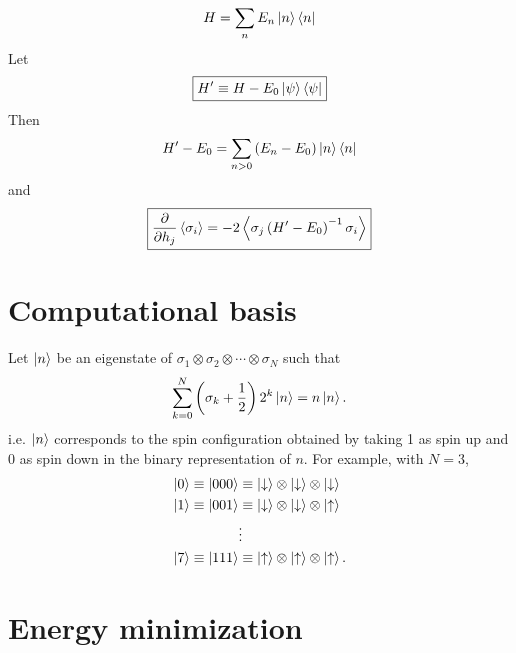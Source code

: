 \begin{equation}
  H = \sum_n E_n \left| n \right> \left< n \right|
  \label{}
\end{equation}
Let
\begin{equation}
  \boxed{
  H^{\prime} \equiv H - E_0 \left| \psi \right> \left< \psi \right|
  }
  \label{}
\end{equation}
Then
\begin{equation}
  H^{\prime} - E_0 = \sum_{n>0} \left( E_n - E_0 \right) \left| n \right> \left< n \right|
  \label{}
\end{equation}
and
\begin{equation}
  \boxed{
  \frac{\partial }{\partial h_j} \left< \sigma_i \right>
  = -2 \left< \sigma_j \left( H^{\prime} - E_0 \right)^{-1} \sigma_i \right>
  }
  \label{}
\end{equation}

\section{Computational basis}

Let $\left| n \right>$ be an eigenstate of
$\sigma_1 \otimes \sigma_2 \otimes \cdots \otimes \sigma_N$
such that
\begin{equation}
    \sum_{k=0}^N \left( \sigma_k + \frac{1}{2} \right) 2^k \left| n \right> = n \left| n \right>.
  \label{}
\end{equation}
i.e. $\left| n \right>$ corresponds to the spin configuration obtained by taking 1
as spin up and 0 as spin down in the binary representation of $n$.
For example, with $N=3$,
\begin{align*}
  \left| 0 \right> \equiv \left| 000 \right>
  &\equiv
  \left| \downarrow \right> \otimes
  \left| \downarrow \right> \otimes
  \left| \downarrow \right> \\
  \left| 1 \right> \equiv \left| 001 \right>
  &\equiv
  \left| \downarrow \right> \otimes
  \left| \downarrow \right> \otimes
  \left| \uparrow \right> \\
  &\vdots \\
  \left| 7 \right> \equiv \left| 111 \right>
  &\equiv
  \left| \uparrow \right> \otimes
  \left| \uparrow \right> \otimes
  \left| \uparrow \right>.
  \label{}
\end{align*}

\section{Energy minimization}

